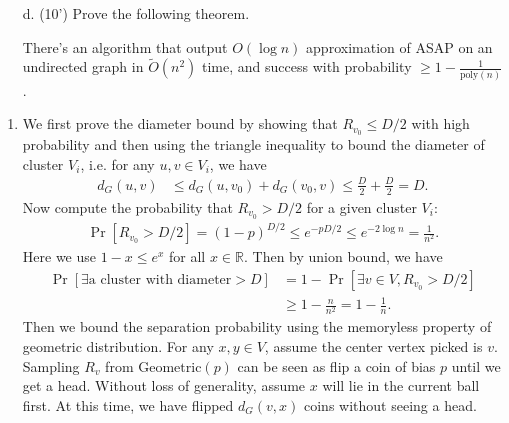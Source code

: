     \begin{itemize}
        \item [d. (10')] Prove the following theorem. 

        \begin{theorem}
            There's an algorithm that output $O(\log n)$ approximation of ASAP on an undirected graph in $\tilde{O}(n ^ 2)$ time, and success with probability $\ge 1 - \frac 1{\text{poly}(n)}$.
        \end{theorem}
    \end{itemize}

\newpage
\begin{answer}
    \begin{enumerate}[label=\alph*).]
        \item We first prove the diameter bound by showing that $R_{v_0} \le D/2$ with high probability and then using 
        the triangle inequality to bound the diameter of cluster $V_i$, i.e. for any $u, v \in V_i$, we have
        \begin{align*}
            d_G(u, v) &\le d_G(u, v_0) + d_G(v_0, v) \le \frac{D}{2} + \frac{D}{2} = D.
        \end{align*}
        Now compute the probability that $R_{v_0} > D/2$ for a given cluster $V_i$:
        \begin{align*}
            \Pr[R_{v_0} > D/2] = (1 - p)^{D/2} \le e^{-pD/2} \le e^{-2\log n} = \frac{1}{n^2}.
        \end{align*}
        Here we use $1 - x \le e^x$ for all $x \in \mathbb{R}$. Then by union bound, we have
        \begin{align*}
            \Pr\left[\exists \text{a cluster with diameter} > D\right] &= 1 - \Pr\left[\exists v\in V, R_{v_0} > D/2\right] \\
            &\ge 1 - \frac{n}{n^2} = 1 - \frac{1}{n}.
        \end{align*}
        Then we bound the separation probability using the memoryless property of geometric distribution. For any $x, y \in V$, 
        assume the center vertex picked is $v$. Sampling $R_{v}$ from $\mathrm{Geometric}(p)$ can be seen as flip a coin of bias $p$ until we get a head.
        Without loss of generality, assume $x$ will lie in the current ball first. At this time, we have flipped $d_G(v,x)$ coins without seeing a head. 
        

\end{enumerate}
\end{answer}

